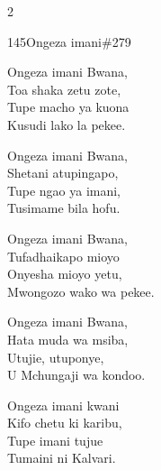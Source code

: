 \begin{multicols}{2}
\begin{hymn}{145}{Ongeza imani}{\#279}
\begin{stanza}
Ongeza imani Bwana,\\
Toa shaka zetu zote,\\
Tupe macho ya kuona\\
Kusudi lako la pekee.
\end{stanza}
\begin{stanza}
Ongeza imani Bwana,\\
Shetani atupingapo,\\
Tupe ngao ya imani,\\
Tusimame bila hofu.
\end{stanza}
\begin{stanza}
Ongeza imani Bwana,\\
Tufadhaikapo mioyo\\
Onyesha mioyo yetu,\\
Mwongozo wako wa pekee.
\end{stanza}
\begin{stanza}
Ongeza imani Bwana,\\
Hata muda wa msiba,\\
Utujie, utuponye,\\
U Mchungaji wa kondoo.
\end{stanza}
\begin{stanza}
Ongeza imani kwani\\
Kifo chetu ki karibu,\\
Tupe imani tujue\\
Tumaini ni Kalvari.
\end{stanza}
\end{hymn}


\end{multicols}
